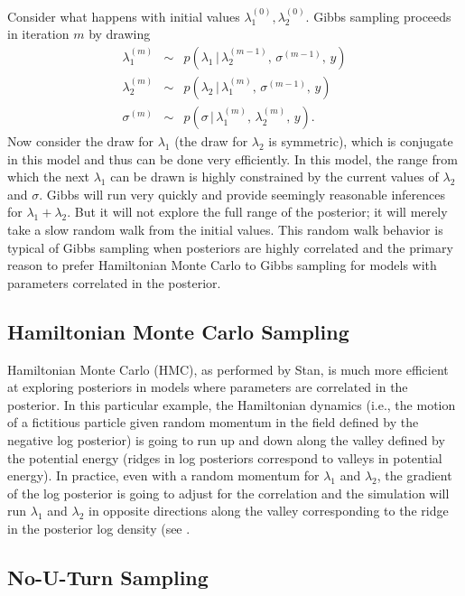 Consider what happens with initial values $\lambda_1^{(0)}, \lambda_2^{(0)}$.
Gibbs sampling proceeds in iteration $m$ by drawing
%
\begin{eqnarray*}
\lambda_1^{(m)}
& \sim & p(\lambda_1 \, | \, \lambda_2^{(m-1)}, \, \sigma^{(m-1)}, \, y)
\\[6pt]
\lambda_2^{(m)}
& \sim & p(\lambda_2 \, | \, \lambda_1^{(m)}, \, \sigma^{(m-1)}, \, y)
\\[6pt]
\sigma^{(m)}
& \sim & p(\sigma \, | \, \lambda_1^{(m)}, \, \lambda_2^{(m)}, \, y).
\end{eqnarray*}
%
Now consider the draw for $\lambda_1$ (the draw for $\lambda_2$ is
symmetric), which is conjugate in this model and thus can be done very
efficiently.  In this model, the range from which the next $\lambda_1$
can be drawn is highly constrained by the current values of
$\lambda_2$ and $\sigma$.  Gibbs will run very quickly and provide
seemingly reasonable inferences for $\lambda_1 + \lambda_2$.  But it
will not explore the full range of the posterior; it will merely take
a slow random walk from the initial values.  This random walk behavior
is typical of Gibbs sampling when posteriors are highly correlated and
the primary reason to prefer Hamiltonian Monte Carlo to Gibbs sampling
for models with parameters correlated in the posterior.

\subsection{Hamiltonian Monte Carlo Sampling}

Hamiltonian Monte Carlo (HMC), as performed by Stan, is much more
efficient at exploring posteriors in models where parameters are
correlated in the posterior.  In this particular example, the
Hamiltonian dynamics (i.e., the motion of a fictitious particle given
random momentum in the field defined by the negative log posterior) is
going to run up and down along the valley defined by the potential
energy (ridges in log posteriors correspond to valleys in potential
energy).  In practice, even with a random momentum for $\lambda_1$ and
$\lambda_2$, the gradient of the log posterior is going to adjust for
the correlation and the simulation will run $\lambda_1$ and
$\lambda_2$ in opposite directions along the valley corresponding to
the ridge in the posterior log density (see
.

\subsection{No-U-Turn Sampling}

